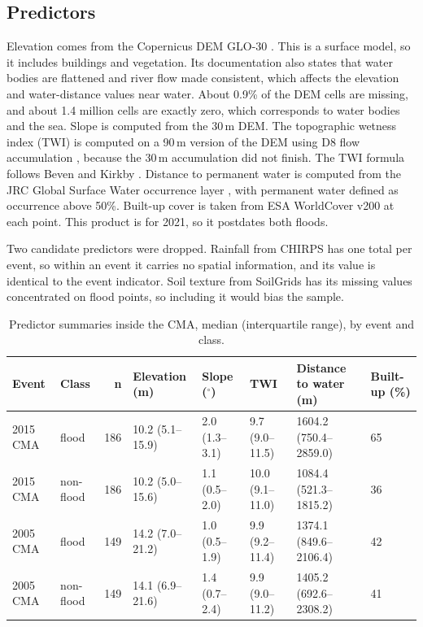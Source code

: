 \documentclass[conference]{IEEEtran}
\begin{document}
\subsection{Predictors}
Elevation comes from the Copernicus DEM GLO-30 \cite{copdem_glo30}. This is a surface model, so it includes buildings and vegetation. Its documentation also states that water bodies are flattened and river flow made consistent, which affects the elevation and water-distance values near water. About 0.9\% of the DEM cells are missing, and about 1.4 million cells are exactly zero, which corresponds to water bodies and the sea. Slope is computed from the 30\,m DEM. The topographic wetness index (TWI) is computed on a 90\,m version of the DEM using D8 flow accumulation \cite{oconnor1984}, because the 30\,m accumulation did not finish. The TWI formula follows Beven and Kirkby \cite{beven1979}. Distance to permanent water is computed from the JRC Global Surface Water occurrence layer \cite{pekel2016}, with permanent water defined as occurrence above 50\%. Built-up cover is taken from ESA WorldCover v200 \cite{zanaga2022} at each point. This product is for 2021, so it postdates both floods.

Two candidate predictors were dropped. Rainfall from CHIRPS \cite{funk2015} has one total per event, so within an event it carries no spatial information, and its value is identical to the event indicator. Soil texture from SoilGrids has its missing values concentrated on flood points, so including it would bias the sample.

\begin{table}[h]
\centering
\caption{Predictor summaries inside the CMA, median (interquartile range), by event and class.}
\label{tab:summary}
\begin{tabular}{llrlllll}
\toprule
Event & Class & n & Elevation (m) & Slope ($^\circ$) & TWI & Distance to water (m) & Built-up (\%) \\
\midrule
2015 CMA & flood & 186 & 10.2 (5.1--15.9) & 2.0 (1.3--3.1) & 9.7 (9.0--11.5) & 1604.2 (750.4--2859.0) & 65 \\
2015 CMA & non-flood & 186 & 10.2 (5.0--15.6) & 1.1 (0.5--2.0) & 10.0 (9.1--11.0) & 1084.4 (521.3--1815.2) & 36 \\
2005 CMA & flood & 149 & 14.2 (7.0--21.2) & 1.0 (0.5--1.9) & 9.9 (9.2--11.4) & 1374.1 (849.6--2106.4) & 42 \\
2005 CMA & non-flood & 149 & 14.1 (6.9--21.6) & 1.4 (0.7--2.4) & 9.9 (9.0--11.2) & 1405.2 (692.6--2308.2) & 41 \\
\bottomrule
\end{tabular}
\end{table}
\end{document}
